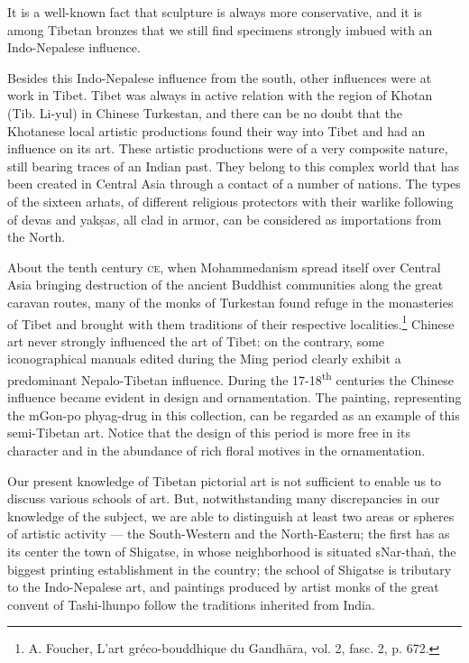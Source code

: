\documentclass[a4paper, 12pt, oneside]{article}
\begin{document}
It is a well-known fact that sculpture is always more conservative, and it is among Tibetan bronzes that we still find specimens strongly imbued with an Indo-Nepalese influence.

Besides this Indo-Nepalese influence from the south, other influences were at work in Tibet. Tibet was always in active relation with the region of Khotan (Tib. Li-yul) in Chinese Turkestan, and there can be no doubt that the Khotanese local artistic productions found their way into Tibet and had an influence on its art. These artistic productions were of a very composite nature, still bearing traces of an Indian past. They belong to this complex world that has been created in Central Asia through a contact of a number of nations. The types of the sixteen arhats, of different religious protectors with their warlike following of devas and yak\d{s}as, all clad in armor, can be considered as importations from the North.

About the tenth century \textsc{ce}, when Mohammedanism spread itself over Central Asia bringing destruction of the ancient Buddhist communities along the great caravan routes, many of the monks of Turkestan found refuge in the monasteries of Tibet and brought with them traditions of their respective localities.\footnote{A. Foucher, L'art gréco-bouddhique du Gandh\={a}ra, vol. 2, fasc. 2, p. 672.} Chinese art never strongly influenced the art of Tibet: on the contrary, some iconographical manuals edited during the Ming period clearly exhibit a predominant Nepalo-Tibetan influence. During the 17-18\textsuperscript{th} centuries the Chinese influence became evident in design and ornamentation. The painting, representing the mGon-po phyag-drug in this collection, can be regarded as an example of this semi-Tibetan art. Notice that the design of this period is more free in its character and in the abundance of rich floral motives in the ornamentation.

Our present knowledge of Tibetan pictorial art is not sufficient to enable us to discuss various schools of art. But, notwithstanding many discrepancies in our knowledge of the subject, we are able to distinguish at least two areas or spheres of artistic activity --- the South-Western and the North-Eastern; the first has as its center the town of Shigatse, in whose neighborhood is situated sNar-tha\.{n}, the biggest printing establishment in the country; the school of Shigatse is tributary to the Indo-Nepalese art, and paintings produced by artist monks of the great convent of Tashi-lhunpo follow the traditions inherited from India.
\end{document}
